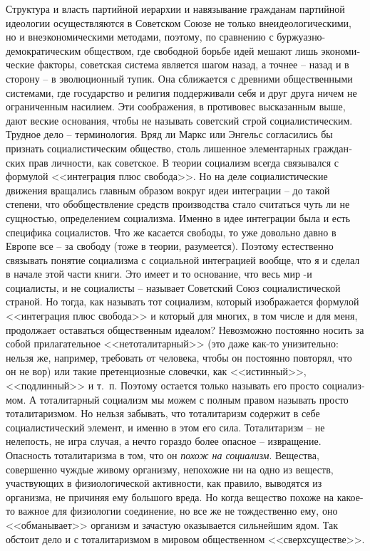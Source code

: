 \documentclass{book}
\begin{document}
Структура и власть партийной иерархии и навязывание граж­данам партийной идеологии осуществляются в Советском Союзе не только внеидеологическими, но и внеэкономическими мето­дами, поэтому, по сравнению с буржуазно-демократическим обществом, где свободной борьбе идей мешают лишь экономи­ческие факторы, советская система является шагом назад, а точнее -- назад и в сторону -- в эволюционный тупик. Она сбли­жается с древними общественными системами, где государст­во и религия поддерживали себя и друг друга ничем не огра­ниченным насилием. Эти соображения, в противовес высказан­ным выше, дают веские основания, чтобы не называть совет­ский строй социалистическим. Трудное дело -- терминология. Вряд ли Маркс или Энгельс согласились бы признать социали­стическим общество, столь лишенное элементарных граждан­ских прав личности, как советское. В теории социализм всегда связывался с формулой <<интеграция плюс свобода>>. Но на де­ле социалистические движения вращались главным образом вокруг идеи интеграции -- до такой 
степени, что обобществле­ние средств производства стало считаться чуть ли не сущностью, определением социализма. Именно в идее интеграции была и есть специфика социалистов. Что же касается свободы, то уже довольно давно в Европе все -- за свободу (тоже в теории, разумеется). Поэтому естественно связывать понятие социализма с социальной интеграцией вообще, что я и сделал в нача­ле этой части книги. Это имеет и то основание, что весь мир -и социалисты, и не социалисты -- называет Советский Союз социалистической страной. Но тогда, как называть тот социа­лизм, который изображается формулой <<интеграция плюс сво­бода>> и который для многих, в том числе и для меня, продол­жает оставаться общественным идеалом? Невозможно постоян­но носить за собой прилагательное <<нетоталитарный>> (это да­же как-то унизительно: нельзя же, например, требовать от че­ловека, чтобы он постоянно повторял, что он не вор) или та­кие претенциозные словечки, как <<истинный>>, <<подлинный>> и т.~п. Поэтому остается только называть его просто 
социализ­мом. А тоталитарный социализм мы можем с полным правом называть просто тоталитаризмом. Но нельзя забывать, что тоталитаризм содержит в себе социалистический элемент, и именно в этом его сила. Тоталитаризм -- не нелепость, не игра случая, а нечто гораздо более опасное -- извращение. Опасность тоталитаризма в том, что он \textit{похож на социализм}.  Вещества, совершенно чуждые живому организму, непохожие ни на одно из веществ, участвующих в физиологической активности, как правило, выводятся из организма, не причиняя ему большого вреда. Но когда вещество похоже на какое-то важное для фи­зиологии соединение, но все же не тождественно ему, оно <<об­манывает>> организм и зачастую оказывается сильнейшим ядом. Так обстоит дело и с тоталитаризмом в мировом общественном <<сверхсуществе>>.
\end{document}

